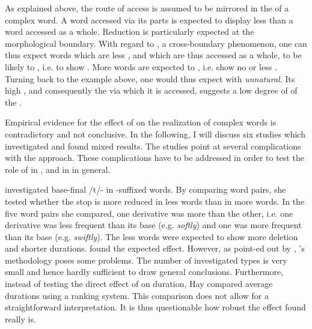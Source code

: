 {As explained above, the route of access is assumed to be mirrored in the  of a complex word. A word accessed via its parts is expected to display less  than a word accessed as a whole. Reduction is particularly expected at the morphological boundary. With regard to , a cross-boundary phenomenon, one can thus expect words which are less , and which are thus accessed as a whole, to be likely to , i.e. to show . More  words are expected to , i.e. show no or less . 
Turning back to the example above, one would thus expect  with \textit{unnatural}. Its high , and consequently the  via which it is accessed, suggests a low degree of  of the .


Empirical evidence for the effect of  on the realization of complex words is contradictory and not conclusive. In the following, I will discuss six studies which investigated  and found mixed results. The studies point at several complications with the approach. These complications have to be addressed in order to test the role of  in , and in  in general. 

 \cite{Hay.2003} investigated  base-final /t/- in -suffixed words. By comparing word pairs, she tested whether the stop is more reduced in less  words than in more  words. In the five word pairs she compared, one derivative was more  than the other, i.e. one derivative was less frequent than its base (e.g. \textit{softly}) and one was more frequent than its base (e.g. \textit{swiftly}). The less  words were expected to show more deletion and shorter durations.  \citeauthor{Hay.2003} found the expected effect. 
 However, as point-ed out by \cite{Hanique.2012}, \citeauthor{Hay.2003}'s methodology poses some problems. The number of investigated types is very small and hence hardly sufficient to draw general conclusions. Furthermore, instead of testing the direct effect of  on duration, Hay compared average durations using a ranking system. This comparison does not allow for a straightforward interpretation. It is thus questionable how robust the effect found really is.

}
